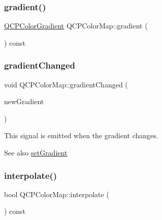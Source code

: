 \subsubsection{\texorpdfstring{gradient()}{gradient()}}
{\footnotesize\ttfamily \hyperlink{class_q_c_p_color_gradient}{Q\+C\+P\+Color\+Gradient} Q\+C\+P\+Color\+Map\+::gradient (\begin{DoxyParamCaption}{ }\end{DoxyParamCaption}) const\hspace{0.3cm}{\ttfamily [inline]}}

\mbox{\label{class_q_c_p_color_map_a31a12726736b1ac274e7b1d8dfb67468}} 
\subsubsection{\texorpdfstring{gradient\+Changed}{gradientChanged}}
{\footnotesize\ttfamily void Q\+C\+P\+Color\+Map\+::gradient\+Changed (\begin{DoxyParamCaption}\item[{const \hyperlink{class_q_c_p_color_gradient}{Q\+C\+P\+Color\+Gradient} \&}]{new\+Gradient }\end{DoxyParamCaption})\hspace{0.3cm}{\ttfamily [signal]}}

This signal is emitted when the gradient changes.

\begin{DoxySeeAlso}{See also}
\hyperlink{class_q_c_p_color_map_a7313c78360471cead3576341a2c50377}{set\+Gradient} 
\end{DoxySeeAlso}
\mbox{\label{class_q_c_p_color_map_a15d1877883fa463d44bfcbfd6840d4ca}} 
\subsubsection{\texorpdfstring{interpolate()}{interpolate()}}
{\footnotesize\ttfamily bool Q\+C\+P\+Color\+Map\+::interpolate (\begin{DoxyParamCaption}{ }\end{DoxyParamCaption}) const\hspace{0.3cm}{\ttfamily [inline]}}

